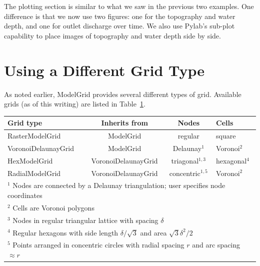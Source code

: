 \documentclass[12pt]{article}
\begin{document}
The plotting section is similar to what we saw in the previous two examples. One difference is that we now use two figures: one for the topography and water depth, and one for outlet discharge over time. We also use Pylab's sub-plot capability to place images of topography and water depth side by side.



\section{Using a Different Grid Type}

As noted earlier, ModelGrid provides several different types of grid. Available grids (as of this writing) are listed in Table~\ref{gridtypestable}.

\begin{table}[htbp]
   \centering
   \begin{tabular}{@{} lccl @{}} %
      \toprule
      
      Grid type & Inherits from & Nodes & Cells \\
      \midrule
      RasterModelGrid  & ModelGrid & regular & square \\
      
      VoronoiDelaunayGrid & ModelGrid & Delaunay$^1$ & Voronoi$^2$ \\
      HexModelGrid & VoronoiDelaunayGrid & triagonal$^{1,3}$ & hexagonal$^4$ \\
      RadialModelGrid & VoronoiDelaunayGrid & concentric$^{1,5}$ & Voronoi$^2$ \\
      \bottomrule
      \multicolumn{4}{l}{$^1$ Nodes are connected by a Delaunay triangulation; user specifies node coordinates} \\
      \multicolumn{4}{l}{$^2$ Cells are Voronoi polygons} \\
      \multicolumn{4}{l}{$^3$ Nodes in regular triangular lattice with spacing $\delta$} \\
      \multicolumn{4}{l}{$^4$ Regular hexagons with side length $\delta/\sqrt{3}$ and area $\sqrt{3} \delta^2 / 2$} \\
      \multicolumn{4}{l}{$^5$ Points arranged in concentric circles with radial spacing $r$ and arc spacing $\approx r$} \\
   \end{tabular}
   \label{gridtypestable}
\end{table}
\end{document}
